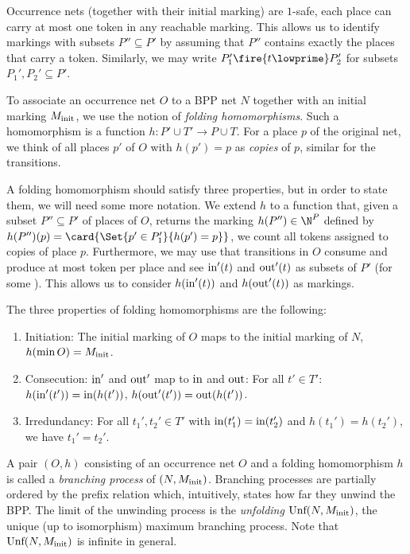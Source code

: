 \documentclass[../../diss.tex]{subfiles}
\begin{document}
Occurrence nets (together with their initial marking) are $1$-safe, \ie each place can carry at most one token in any reachable marking.
This allows us to identify markings with subsets $P'' \subseteq P'$ by assuming that $P''$ contains exactly the places that carry a token.
Similarly, we may write $P_1'\fire{t\lowprime}P_2'$ for subsets $P_1', P_2'\subseteq P'$.

To associate an occurrence net $O$ to a BPP net $N$ together with an initial marking $M_{\text{init}}$, we use the notion of \emph{folding homomorphisms}.
Such a homomorphism is a function $h:P' \cup T' \rightarrow P \cup T$.
For a place $p$ of the original net, we think of all places $p'$ of $O$ with $h(p') = p$ as \emph{copies} of $p$, similar for the transitions.

A folding homomorphism should satisfy three properties, but in order to state them, we will need some more notation.
We extend $h$ to a function that, given a subset $P'' \subseteq P'$ of places of $O$, returns the marking $h(P'') \in \N^P$ defined by $h(P'')(p) = \card{\Set{p'\in P_1'}{h(p')=p}}$, \ie we count all tokens assigned to copies of place $p$.
Furthermore, we may use that transitions in $O$ consume and produce at most token per place and see $\text{in}'(t)$ and $\text{out}'(t)$ as subsets of $P'$ (for some ).
This allows us to consider $h(\text{in}'(t))$ and $h(\text{out}'(t))$ as markings.

%
\cheatpagebreak
%

The three properties of folding homomorphisms are the following:

\begin{enumerate}[(1)]
     \item
         Initiation:
         The initial marking of $O$ maps to the initial marking of $N$,
         $h(\min O)=M_{\text{init}}$.
     \item\label{Property:FoldingHomomorphismConsecution}
         Consecution: $\text{in}'$ and $\text{out}'$ map to $\text{in}$ and $\text{out}$:
         For all $t'\in T'$:
         $h(\text{in}'(t')) = \text{in}(h(t'))$, $h(\text{out}'(t')) = \text{out}(h(t'))$.
     \item
         Irredundancy:
         For all $t_1',t_2' \in T'$ with $\text{in}(t_1') = \text{in}(t_2')$ and $h(t_1') = h(t_2')$, we have $t_1' = t_2'$.
\end{enumerate}

A pair $(O,h)$ consisting of an occurrence net $O$ and a folding homomorphism $h$ is called a \emph{branching process} of $(N, M_{\text{init}})$.
Branching processes are partially ordered by the prefix relation which, intuitively, states how far they unwind the BPP.\@
The limit of the unwinding process is the \emph{unfolding} $\text{Unf}(N, M_{\text{init}})$, the unique (up to isomorphism) maximum branching process.
Note that $\text{Unf}(N, M_{\text{init}})$ is infinite in general.
\end{document}

